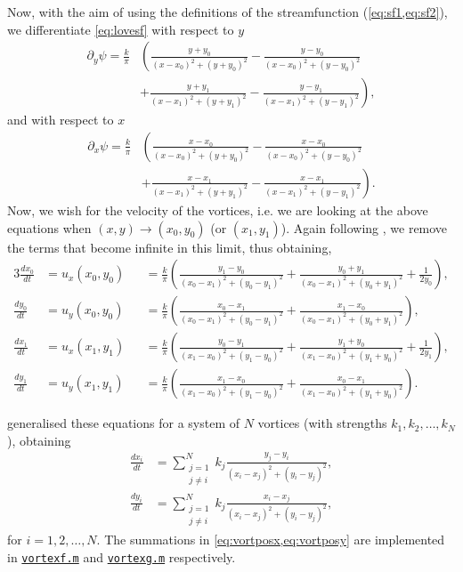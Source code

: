 \documentclass[10pt, a4paper]{article}
\numberwithin{equation}{section}
\begin{document}
Now, with the aim of using the definitions of the streamfunction (\cref{eq:sf1,eq:sf2}), we differentiate \cref{eq:lovesf} with respect to $y$
\begin{align}
\partial_y \psi = \frac{k}{\pi}&\left(\frac{y+y_0}{(x-x_0)^2 + (y+y_0)^2}-\frac{y-y_0}{(x-x_0)^2 + (y-y_0)^2}\right.\nonumber\\&\left.+\frac{y+y_1}{(x-x_1)^2 + (y+y_1)^2}-\frac{y-y_1}{(x-x_1)^2 + (y-y_1)^2}\right),
\label{eq:lovesfdy}
\end{align}
and with respect to $x$
\begin{align}
\partial_x \psi = \frac{k}{\pi}&\left(\frac{x-x_0}{(x-x_0)^2 + (y+y_0)^2}-\frac{x-x_0}{(x-x_0)^2 + (y-y_0)^2}\right.\nonumber\\&\left.+\frac{x-x_1}{(x-x_1)^2 + (y+y_1)^2}-\frac{x-x_1}{(x-x_1)^2 + (y-y_1)^2}\right).
\label{eq:lovesfdx}
\end{align}
Now, we wish for the velocity of the vortices, i.e. we are looking at the above equations when $(x,y)\rightarrow(x_0,y_0)$ (or $(x_1,y_1)$).
Again following \citeauthor{love94}, we remove the terms that become infinite in this limit, thus obtaining,
\begin{alignat}{3}
\frac{dx_0}{dt}&=u_x (x_0,y_0)&&= \frac{k}{\pi} \left( \frac{y_1-y_0}{(x_0-x_1)^2 + (y_0-y_1)^2} + \frac{y_0+y_1}{(x_0-x_1)^2 +(y_0+y_1)^2} + \frac{1}{2y_0}\right),\label{eq:vortm1}\\
\frac{dy_0}{dt}&=u_y (x_0,y_0)&&= \frac{k}{\pi} \left( \frac{x_0-x_1}{(x_0-x_1)^2 + (y_0-y_1)^2} + \frac{x_1-x_0}{(x_0-x_1)^2 +(y_0+y_1)^2}\right),\label{eq:vortm2}\\
\frac{dx_1}{dt}&=u_x (x_1,y_1)&&= \frac{k}{\pi} \left( \frac{y_0-y_1}{(x_1-x_0)^2 + (y_1-y_0)^2} + \frac{y_1+y_0}{(x_1-x_0)^2 +(y_1+y_0)^2} + \frac{1}{2y_1}\right),\label{eq:vortm3}\\
\frac{dy_1}{dt}&=u_y (x_1,y_1)&&= \frac{k}{\pi} \left( \frac{x_1-x_0}{(x_1-x_0)^2 + (y_1-y_0)^2} + \frac{x_0-x_1}{(x_1-x_0)^2 +(y_1+y_0)^2} \right).\label{eq:vortm4}
\end{alignat}

\citet{acheson00} generalised these equations for a system of $N$ vortices (with strengths $k_1,k_2,\ldots ,k_N$), obtaining
\begin{align}
\frac{dx_i}{dt}&=\sum^N_{\substack{j=1\\j\neq i}} k_j \frac{y_j - y_i}{(x_i - x_j)^2 + (y_i - y_j)^2},\label{eq:vortposx}\\
\frac{dy_i}{dt}&=\sum^N_{\substack{j=1\\j\neq i}} k_j \frac{x_i - x_j}{(x_i - x_j)^2 + (y_i - y_j)^2},\label{eq:vortposy}
\end{align}
for $i=1,2,\ldots, N$.
The summations in \cref{eq:vortposx,eq:vortposy} are implemented in \hyperref[vortexf]{\texttt{vortexf.m}} and \hyperref[vortexg]{\texttt{vortexg.m}} respectively.
\end{document}
